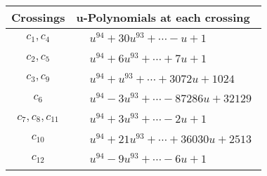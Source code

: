 \documentclass[1p]{elsarticle_modified}
\theoremstyle{definition}
\begin{document}
\begin{tabular}{m{50pt}|m{274pt}}
Crossings & \hspace{64pt}u-Polynomials at each crossing \\
\hline $$\begin{aligned}c_{1},c_{4}\end{aligned}$$&$\begin{aligned}
&u^{94}+30 u^{93}+\cdots- u+1
\end{aligned}$\\
\hline $$\begin{aligned}c_{2},c_{5}\end{aligned}$$&$\begin{aligned}
&u^{94}+6 u^{93}+\cdots+7 u+1
\end{aligned}$\\
\hline $$\begin{aligned}c_{3},c_{9}\end{aligned}$$&$\begin{aligned}
&u^{94}+u^{93}+\cdots+3072 u+1024
\end{aligned}$\\
\hline $$\begin{aligned}c_{6}\end{aligned}$$&$\begin{aligned}
&u^{94}-3 u^{93}+\cdots-87286 u+32129
\end{aligned}$\\
\hline $$\begin{aligned}c_{7},c_{8},c_{11}\end{aligned}$$&$\begin{aligned}
&u^{94}+3 u^{93}+\cdots-2 u+1
\end{aligned}$\\
\hline $$\begin{aligned}c_{10}\end{aligned}$$&$\begin{aligned}
&u^{94}+21 u^{93}+\cdots+36030 u+2513
\end{aligned}$\\
\hline $$\begin{aligned}c_{12}\end{aligned}$$&$\begin{aligned}
&u^{94}-9 u^{93}+\cdots-6 u+1
\end{aligned}$\\
\hline
\end{tabular}\\~\\
\newpage\renewcommand{\arraystretch}{1}
\end{document}
